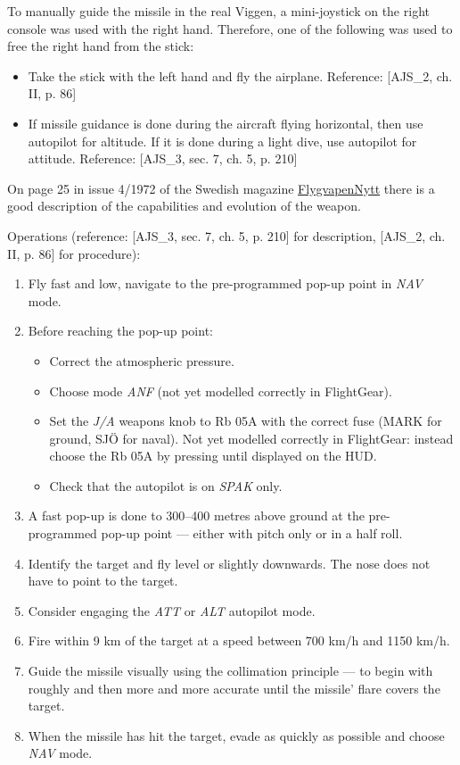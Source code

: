 {To manually guide the missile in the real Viggen, a mini-joystick on the right console was used with the right hand. Therefore, one of the following was used to free the right hand from the stick:
\begin{itemize}
 \item Take the stick with the left hand and fly the airplane. Reference: [AJS\_2, ch. II, p. 86]
 \item If missile guidance is done during the aircraft flying horizontal, then use autopilot for altitude. If it is done during a light dive, use autopilot for attitude. Reference: [AJS\_3, sec. 7, ch. 5, p. 210]
\end{itemize}

On page 25 in issue 4/1972 of the Swedish magazine \href{https://www.aef.se/Flygvapnet/Tidskrifter/FV_Nytt/Flygvapennytt_1972-4.pdf}{FlygvapenNytt} there is a good description of the capabilities and evolution of the weapon.

Operations (reference: [AJS\_3, sec. 7, ch. 5, p. 210] for description, [AJS\_2, ch. II, p. 86] for procedure):
\begin{enumerate}
 \item Fly fast and low, navigate to the pre-programmed pop-up point in \emph{NAV} mode.
 \item Before reaching the pop-up point:
 \begin{itemize}
  \item Correct the atmospheric pressure.
  \item Choose mode \emph{ANF} (not yet modelled correctly in FlightGear).
  \item Set the \emph{J/A} weapons knob to Rb 05A with the correct fuse (MARK for ground, SJÖ for naval). Not yet modelled correctly in FlightGear: instead choose the Rb 05A by pressing  until displayed on the HUD.
  \item Check that the autopilot is on \emph{SPAK} only.
 \end{itemize}
 \item A fast pop-up is done to 300--400 metres above ground at the pre-programmed pop-up point --- either with pitch only or in a half roll.
 \item Identify the target and fly level or slightly downwards. The nose does not have to point to the target. 
 \item Consider engaging the \emph{ATT} or \emph{ALT} autopilot mode.
 \item Fire within 9 km of the target at a speed between 700 km/h and 1150 km/h.
 \item Guide the missile visually using the collimation principle --- to begin with roughly and then more and more accurate until the missile' flare covers the target.
 \item When the missile has hit the target, evade as quickly as possible and choose \emph{NAV} mode.
\end{enumerate}

}
